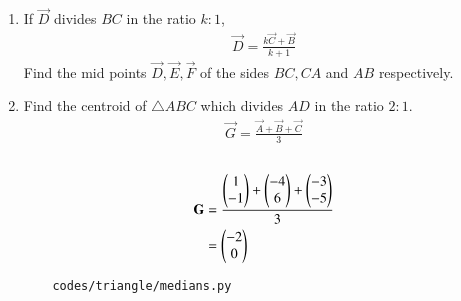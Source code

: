 \begin{enumerate}[label=\thesubsection.\arabic*.,ref=\thesubsection.\theenumi]
\item If $\vec{D}$ divides $BC$ in the ratio $k : 1$,
		\begin{align}
			\vec{D}= \frac{k\vec{C}+\vec{B}}{k+1}
	  \label{eq:app-section_formula}
		\end{align}
		Find the mid points $\vec{D}, \vec{E}, \vec{F}$ of the sides $BC, CA$ and $AB$ respectively.
	\\
		  
	\item Find the centroid  of $\triangle ABC$ which divides $AD$ in the ratio $2:1$.
		\begin{align}
			\vec{G}=\frac{\vec{A}+\vec{B}+\vec{C}}{3}
		\end{align}
   \\
\solution
\begin{equation}
\begin{split}
\label{eq:centroid}
    \mathbf{G}&= \frac{\begin{pmatrix}1\\-1\end{pmatrix}+\begin{pmatrix}-4\\6\end{pmatrix}+\begin{pmatrix}-3\\-5\end{pmatrix}}{3}\\    
     &= \begin{pmatrix}-2\\0\end{pmatrix}
\end{split}
\end{equation}
\begin{lstlisting}
	codes/triangle/medians.py
\end{lstlisting}
\end{enumerate}
